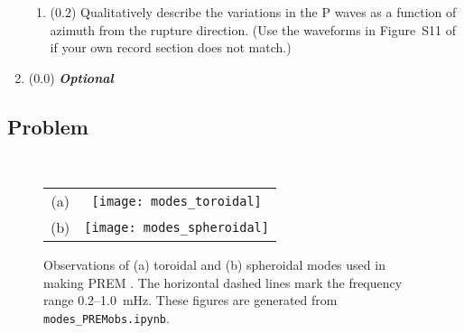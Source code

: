 \documentclass[11pt,titlepage,fleqn]{article}
\begin{document}
\begin{enumerate}
\begin{enumerate}
\item (0.2) Qualitatively describe the variations in the P waves as a function of azimuth from the rupture direction. (Use the waveforms in Figure~S11 of \citet{Ammon2005} if your own record section does not match.)
\end{enumerate}


\item (0.0) {\bf\em Optional} 

\end{enumerate}


\subsection*{Problem} \howmuchtime\

\pagebreak


\clearpage\pagebreak


\clearpage\pagebreak
\begin{figure}
\centering
\begin{tabular}{cc}
(a) & \texttt{[image: modes\_toroidal]} \\
(b) & \texttt{[image: modes\_spheroidal]}
\end{tabular}
\caption[]
{{
Observations of (a) toroidal and (b) spheroidal modes used in making PREM \citep{PREM}.
The horizontal dashed lines mark the frequency range 0.2--1.0~mHz.
These figures are generated from {\tt modes\_PREMobs.ipynb}.
}}
\label{fig:premmodes}
\end{figure}

\iffalse

\clearpage\pagebreak
\begin{figure}
\centering
\texttt{[image: sumatra\_JBtraveltime.eps]}
\caption[]
{{
P wave traveltimes from Jeffreys--Bullen tables.
The calculations are based on a source depth of 10~km.
(a) Apparent P velocity as a function epicentral distances, based on the Jeffreys--Bullen travel time tables. 
The mean velocity over the epicentral distance range $30^\circ < \Delta_{\rm deg} < 85^\circ$ is 10.8~km/s, which would provide a very rough approximation for the P wave velocity for all stations.
(b) Linear fit transformed to traveltime: $P_t = \Delta_{\rm km} \,/\, (0.616 \Delta_{\rm deg} + 7.25)$.
}}
\label{fig:JB}
\end{figure}

\fi



\end{document}
